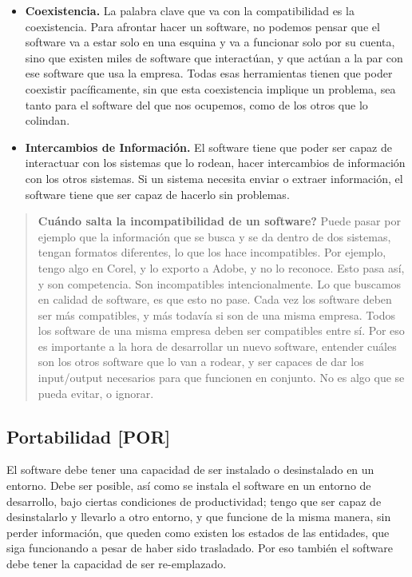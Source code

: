 \begin{itemize}

\item
  \textbf{Coexistencia.} La palabra clave que va con la compatibilidad
  es la coexistencia. Para afrontar hacer un software, no podemos pensar
  que el software va a estar solo en una esquina y va a funcionar solo
  por su cuenta, sino que existen miles de software que interactúan, y
  que actúan a la par con ese software que usa la empresa. Todas esas
  herramientas tienen que poder coexistir pacíficamente, sin que esta
  coexistencia implique un problema, sea tanto para el software del que
  nos ocupemos, como de los otros que lo colindan.
\item
  \textbf{Intercambios de Información.} El software tiene que poder ser
  capaz de interactuar con los sistemas que lo rodean, hacer
  intercambios de información con los otros sistemas. Si un sistema
  necesita enviar o extraer información, el software tiene que ser capaz
  de hacerlo sin problemas.
\end{itemize}

\begin{quote}
\textbf{Cuándo salta la incompatibilidad de un software?} Puede pasar
por ejemplo que la información que se busca y se da dentro de dos
sistemas, tengan formatos diferentes, lo que los hace incompatibles. Por
ejemplo, tengo algo en Corel, y lo exporto a Adobe, y no lo reconoce.
Esto pasa así, y son competencia. Son incompatibles intencionalmente. Lo
que buscamos en calidad de software, es que esto no pase. Cada vez los
software deben ser más compatibles, y más todavía si son de una misma
empresa. Todos los software de una misma empresa deben ser compatibles
entre sí. Por eso es importante a la hora de desarrollar un nuevo
software, entender cuáles son los otros software que lo van a rodear, y
ser capaces de dar los input/output necesarios para que funcionen en
conjunto. No es algo que se pueda evitar, o ignorar.
\end{quote}

\hypertarget{portabilidad-por}{%
\subsection{Portabilidad {[}POR{]}}\label{portabilidad-por}}

El software debe tener una capacidad de ser instalado o desinstalado en
un entorno. Debe ser posible, así como se instala el software en un
entorno de desarrollo, bajo ciertas condiciones de productividad; tengo
que ser capaz de desinstalarlo y llevarlo a otro entorno, y que funcione
de la misma manera, sin perder información, que queden como existen los
estados de las entidades, que siga funcionando a pesar de haber sido
trasladado. Por eso también el software debe tener la capacidad de ser
re-emplazado.


